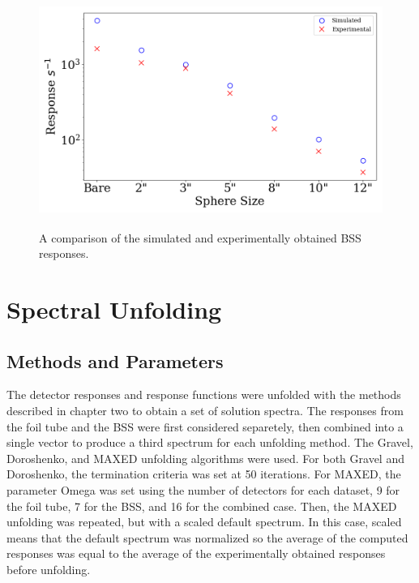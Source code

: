 \begin{figure}[htb]
\centering
\includegraphics[height=3in]{tex/figures/compare_countrates.png}
\caption[BSS Responses]{A comparison of the simulated and experimentally obtained BSS responses.}
\label{fig:compare_countrates}
\end{figure}


\section{Spectral Unfolding}

\subsection{Methods and Parameters}

The detector responses and response functions were unfolded with the methods described in chapter two to obtain a set of solution spectra.
The responses from the foil tube and the BSS were first considered separetely, then combined into a single vector to produce a third spectrum for each unfolding method.
The Gravel, Doroshenko, and MAXED unfolding algorithms were used.
For both Gravel and Doroshenko, the termination criteria was set at 50 iterations.
For MAXED, the parameter Omega was set using the number of detectors for each dataset, 9 for the foil tube, 7 for the BSS, and 16 for the combined case.
Then, the MAXED unfolding was repeated, but with a scaled default spectrum.
In this case, scaled means that the default spectrum was normalized so the average of the computed responses was equal to the average of the experimentally obtained responses before unfolding.

